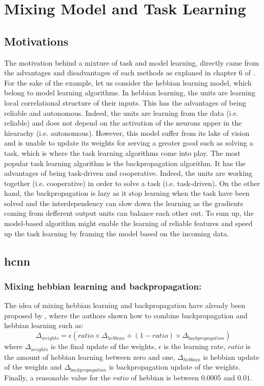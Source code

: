 \documentclass[11pt]{report}
\begin{document}
\chapter{Mixing Model and Task Learning} \label{model_and_task_learning}

\section{Motivations}

The motivation behind a mixture of task and model learning, directly came from the advantages and disadvantages of each methods as explaned in chapter 6 of \textcite{OReilly:2000:CEC:557205}. For the sake of the example, let us consider the hebbian learning model, which belong to model learning algorithms. In hebbian learning, the units are learning local correlational structure of their inputs. This has the advantages of being reliable and autonomous. Indeed, the units are learning from the data (i.e. reliable) and does not depend on the activation of the neurons upper in the hiearachy (i.e. autonomous). However, this model suffer from its lake of vision and is unable to update its weights for serving a greater good such as solving a task, which is where the task learning algorithms come into play. The most popular task learning algorithm is the backpropagation algorithm. It has the advantages of being task-driven and cooperative. Indeed, the units are working together (i.e. cooperative) in order to solve a task (i.e. task-driven). On the other hand, the backpropagation is lazy as it stop learning when the task have been solved and the interdependency can slow down the learning as the gradients coming from defferent output units can balance each other out. To sum up, the model-based algorithm might enable the learning of reliable features and speed up the task learning by framing the model based on the incoming data.

\section{\acrlong{hcnn}}

\subsection{Mixing hebbian learning and backpropagation:} \label{sec:mix_hebb_bp}

The idea of mixing hebbian learning and backpropagation have already been proposed by \textcite{OReilly:2000:CEC:557205}, where the authors shown how to combine backpropagation and hebbian learning such as:
\begin{equation}
\Delta_{weights} = \epsilon (ratio \times \Delta_{hebbian} + (1 - ratio) \times \Delta_{backpropagation})
\end{equation}
where $\Delta_{weights}$ is the final update of the weights, $\epsilon$ is the learning rate, $ratio$ is the amount of hebbian learning between zero and one, $\Delta_{hebbian}$ is hebbian update of the weights and $\Delta_{backpropagation}$ is backpropagation update of the weights. Finally, a reasonable value for the $ratio$ of hebbian is between $0.0005$ and $0.01$.
\end{document}
